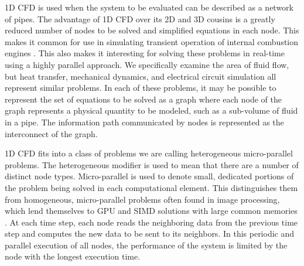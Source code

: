      1D CFD is used when the system to be evaluated can be described as a network of pipes.  
     The advantage of 1D CFD over its 2D and 3D cousins is a greatly reduced number of nodes to be solved and simplified equations in each node.  
     This makes it common for use in simulating transient operation of internal combustion engines \cite{SAE2009010695}.  
     This also makes it interesting for solving these problems in real-time using a highly parallel approach.   
	We specifically examine the area of fluid flow, but heat transfer, mechanical dynamics, and electrical circuit simulation all represent similar problems.  
        In each of these problems, it may be possible to represent the set of equations to be solved as a graph where each node of the graph represents a physical quantity to be modeled, such as a sub-volume of fluid in a pipe.  
        The information path communicated by nodes is represented as the interconnect of the graph. 
	 
	1D CFD fits into a class of problems we are calling heterogeneous micro-parallel problems. 
        The heterogeneous modifier is used to mean that there are a number of distinct node types.  Micro-parallel is used to denote small, dedicated portions of the problem being solved in each computational element. 
        This distinguishes them from homogeneous, micro-parallel problems often found in image processing, which lend themselves to GPU and SIMD solutions with large common memories \cite{10.1109/FCCM.2006.20}.
        At each time step, each node reads the neighboring data from the previous time step and computes the new data to be sent to its neighbors.
        In this periodic and parallel execution of all nodes, the performance of the system is limited by the node with the longest execution time. 
        
